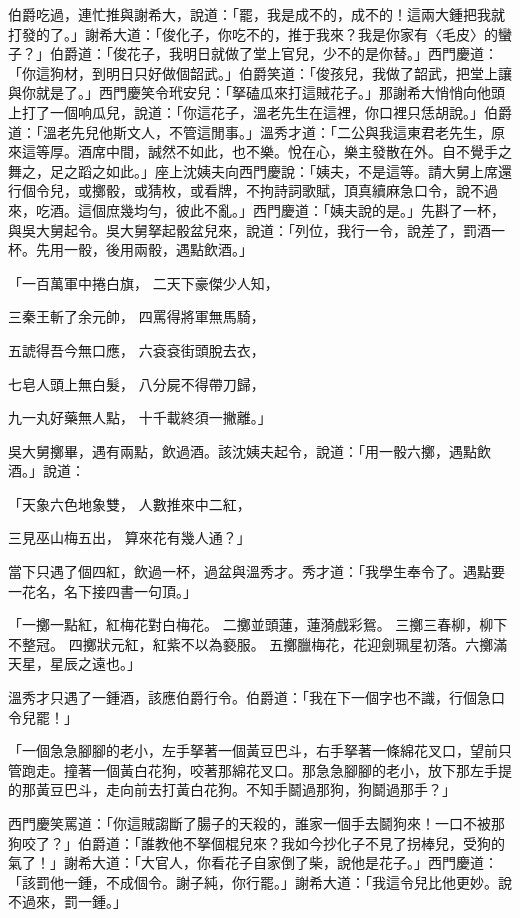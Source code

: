 伯爵吃過，連忙推與謝希大，說道：「罷，我是成不的，成不的！這兩大鍾把我就打發的了。」謝希大道：「俊化子，你吃不的，推于我來？我是你家有〈毛皮〉的蠻子？」伯爵道：「俊花子，我明日就做了堂上官兒，少不的是你替。」西門慶道：「你這狗材，到明日只好做個韶武。」伯爵笑道：「俊孩兒，我做了韶武，把堂上讓與你就是了。」西門慶笑令玳安兒：「拏磕瓜來打這賊花子。」那謝希大悄悄向他頭上打了一個响瓜兒，說道：「你這花子，溫老先生在這裡，你口裡只恁胡說。」伯爵道：「溫老先兒他斯文人，不管這閒事。」溫秀才道：「二公與我這東君老先生，原來這等厚。酒席中間，誠然不如此，也不樂。悅在心，樂主發散在外。自不覺手之舞之，足之蹈之如此。」座上沈姨夫向西門慶說：「姨夫，不是這等。請大舅上席還行個令兒，或擲骰，或猜枚，或看牌，不拘詩詞歌賦，頂真續麻急口令，說不過來，吃酒。這個庶幾均勻，彼此不亂。」西門慶道：「姨夫說的是。」先斟了一杯，與吳大舅起令。吳大舅拏起骰盆兒來，說道：「列位，我行一令，說差了，罰酒一杯。先用一骰，後用兩骰，遇點飲酒。」

「一百萬軍中捲白旗，  二天下豪傑少人知，

三秦王斬了余元帥，  四罵得將軍無馬騎，

五諕得吾今無口應，  六袞袞街頭脫去衣，

七皂人頭上無白髮，  八分屍不得帶刀歸，

九一丸好藥無人點，  十千載終須一撇離。」

吳大舅擲畢，遇有兩點，飲過酒。該沈姨夫起令，說道：「用一骰六擲，遇點飲酒。」說道：

「天象六色地象雙，  人數推來中二紅，

三見巫山梅五出，  算來花有幾人通？」

當下只遇了個四紅，飲過一杯，過盆與溫秀才。秀才道：「我學生奉令了。遇點要一花名，名下接四書一句頂。」

「一擲一點紅，紅梅花對白梅花。  二擲並頭蓮，蓮漪戲彩鴛。  三擲三春柳，柳下不整冠。  四擲狀元紅，紅紫不以為褻服。  五擲臘梅花，花迎劍珮星初落。六擲滿天星，星辰之遠也。」

溫秀才只遇了一鍾酒，該應伯爵行令。伯爵道：「我在下一個字也不識，行個急口令兒罷！」

「一個急急腳腳的老小，左手拏著一個黃豆巴斗，右手拏著一條綿花叉口，望前只管跑走。撞著一個黃白花狗，咬著那綿花叉口。那急急腳腳的老小，放下那左手提的那黃豆巴斗，走向前去打黃白花狗。不知手鬬過那狗，狗鬬過那手？」

西門慶笑罵道：「你這賊謅斷了腸子的天殺的，誰家一個手去鬬狗來！一口不被那狗咬了？」伯爵道：「誰教他不拏個棍兒來？我如今抄化子不見了拐棒兒，受狗的氣了！」謝希大道：「大官人，你看花子自家倒了柴，說他是花子。」西門慶道：「該罰他一鍾，不成個令。謝子純，你行罷。」謝希大道：「我這令兒比他更妙。說不過來，罰一鍾。」

